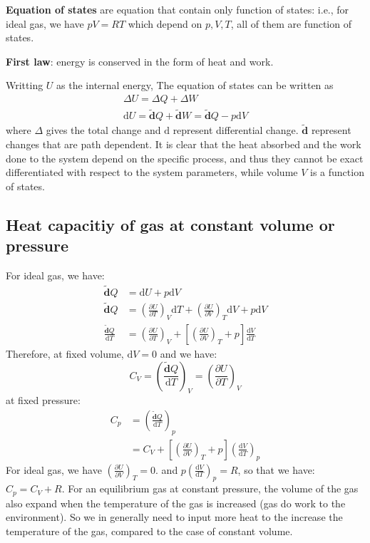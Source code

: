 \documentclass{article}
\newcommand{\pfrac}[2]{\frac{\partial #1}{\partial #2}}
\newcommand{\dbar}{\mathbf{\tilde{d}}}
\newcommand{\dnor}{\text{d}}
\begin{document}
\textbf{Equation of states} are equation that contain only function of states:
i.e., for ideal gas, we have $pV = RT$ which depend on $p, V, T$, all of them are 
function of states.

\textbf{First law}: energy is conserved in the form of heat and work.

Writting $U$ as the internal energy, The equation of states can be written as
\begin{gather}
    \Delta U = \Delta Q + \Delta W \\
    \dnor U = \dbar Q + \dbar W = \dbar Q - p \dnor V
\end{gather}
where $\Delta$ gives the total change and $\dnor$ represent differential change. $\dbar$
represent changes that are path dependent. It is clear that 
the heat absorbed and the work done to the system depend on the specific process, and 
thus they cannot be exact differentiated with respect to the system parameters, while 
volume $V$ is a function of states.

\subsection{Heat capacitiy of gas at constant volume or pressure}
For ideal gas, we have:
\begin{align}
    \dbar Q &= \dnor U + p \dnor V \\
    \dbar Q & = \left(\pfrac{U}{T}\right)_V \dnor T + \left(\pfrac{U}{V}\right)_T \dnor V + p \dnor V \\
    \frac{\dbar Q}{\dnor T} &= \left(\pfrac{U}{T}\right)_V + \left[ \left(\pfrac{U}{V}\right)_T  + p \right] \frac{\dnor V}{\dnor T}
\end{align}
Therefore, at fixed volume, $\dnor V = 0$ and we have:
\begin{equation}
    C_V = \left(\frac{\dbar Q}{\dnor T}\right)_V = \left(\pfrac{U}{T}\right)_V
\end{equation}
at fixed pressure:
\begin{align}
    C_p & = \left(\frac{\dbar Q}{\dnor T}\right)_p \\
        & = C_V + \left[ \left(\pfrac{U}{V}\right)_T  + p \right] \left(\frac{\dnor V}{\dnor T}\right)_p
\end{align}
For ideal gas, we have $\left(\pfrac{U}{V}\right)_T = 0$. and $p \left(\frac{\dnor V}{\dnor T}\right)_p = R$,
so that we have: $C_p = C_V + R$. For an equilibrium gas at constant pressure, the volume of the gas also expand when
the temperature of the gas is increased (gas do work to the environment). 
So we in generally need to input more heat to the increase the temperature of the gas, compared to the case of constant 
volume. 
\end{document}
